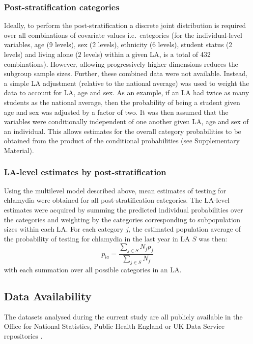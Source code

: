 \documentclass[fleqn,10pt]{wlscirep}
\begin{document}
\subsubsection*{Post-stratification categories}
Ideally, to perform the post-stratification a discrete joint distribution is required over all combinations of covariate values i.e.\ categories (for the individual-level variables, age (9 levels), sex (2 levels), ethnicity (6 levels), student status (2 levels) and living alone (2 levels) within a given LA, is a total of 432 combinations). However, allowing progressively higher dimensions reduces the subgroup sample sizes. Further, these combined data were not available. Instead, a simple LA adjustment (relative to the national average) was used to weight the data to account for LA, age and sex. As an example, if an LA had twice as many students as the national average, then the probability of being a student given age and sex was adjusted by a factor of two.
It was then assumed that the variables were conditionally independent of one another given LA, age and sex of an individual. This allows estimates for the overall category probabilities to be obtained from the product of the conditional probabilities (see Supplementary Material). 

\subsubsection*{LA-level estimates by post-stratification}
Using the multilevel model described above, mean estimates of testing for chlamydia were obtained for all post-stratification categories. The LA-level estimates were acquired by summing the predicted individual probabilities over the categories and weighting by the categories corresponding to subpopulation sizes within each LA.
For each category $j$, the estimated population average of the probability of testing for chlamydia in the last year in LA $S$ was then:
\begin{equation}
p_{la} = \frac{\sum_{j\in S} N_j p_j}{\sum_{j\in S} N_j}
\end{equation}
with each summation over all possible categories in an LA.

\subsection*{Data Availability}

The datasets analysed during the current study are all publicly available in the Office for National Statistics, Public Health England or UK Data Service repositories \cite{OfficeforNationalStatistics2011,OfficeforNationalStatistics2011a,DepartmentforCommunitiesandLocalGovernment,ONS_cesnsusdata,ONS_conceptions,ONS_urbanrural,PublicHealthEngland,Johnson2017}.
\end{document}
